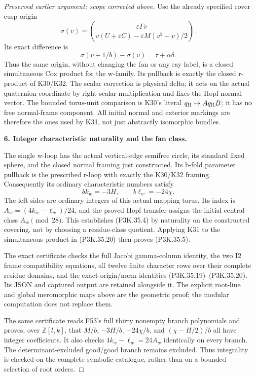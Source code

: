 \begin{proof}[Preserved earlier argument; scope corrected above]
Use the already specified cover cusp origin
\[
 \sigma(v)=\binom{\varepsilon\Gamma v}
                {v(U+\varepsilon C)-\varepsilon M(v^2-v)/2}.
\]
Its exact difference is
\[
               \sigma(v+1/b)-\sigma(v)=\tau+\alpha\delta.
                                                               \tag{P3K.35.20}
\]
Thus the same origin, without changing the fan or any ray label,
is a closed simultaneous Cox product for the w-family. Its
pullback is exactly the closed r-product of K30/K32. The scalar
correction is physical delta; it acts on the actual quaternion
coordinate by right scalar multiplication and fixes the Hopf
normal vector. The bounded torus-unit comparison is K30's
literal \(q_{\rm H}\mapsto A q_{\rm H}B\); it has no free
normal-frame component. All initial normal and exterior markings
are therefore the ones used by K31, not just abstractly
isomorphic bundles.

\par\medskip\noindent\textbf{6. Integer characteristic naturality and the fan class.}\enspace

The single w-loop has the actual vertical-edge semifree circle,
its standard fixed sphere, and the closed normal framing just
constructed. Its b-fold parameter pullback is the prescribed
r-loop with exactly the K30/K32 framing. Consequently its
ordinary characteristic numbers satisfy
\[
 b k_w=-3H,\qquad b\ell_w=-24\chi.
\]
The left sides are ordinary integers of this actual mapping
torus. Its index is \(A_w=(4k_w-\ell_w)/24\), and the proved
Hopf transfer assigns the initial central class
\(A_w\pmod{28}\). This establishes (P3K.35.4) by naturality on
the constructed covering, not by choosing a residue-class
quotient. Applying K31 to the simultaneous product in (P3K.35.20)
then proves (P3K.35.5).

The exact certificate 
checks the full Jacobi gamma-column identity, the two I2 frame
compatibility equations, all twelve finite character rows over
their complete residue domains, and the exact origin/norm
identities (P3K.35.19)--(P3K.35.20). Its JSON and captured output are
retained alongside it. The explicit root-line and global
meromorphic maps above are the geometric proof; the modular
computation does not replace them.

The same certificate reads F53's full thirty nonempty branch
polynomials and proves, over \(\mathbb Z[l,k]\), that
\(M/b\), \(-3H/b\), \(-24\chi/b\), and
\((\chi-H/2)/b\) all have integer coefficients. It also checks
\(4k_w-\ell_w=24A_w\) identically on every branch. The
determinant-excluded good/good branch remains excluded. Thus
integrality is checked on the complete symbolic catalogue,
rather than on a bounded selection of root orders.


\end{proof}
